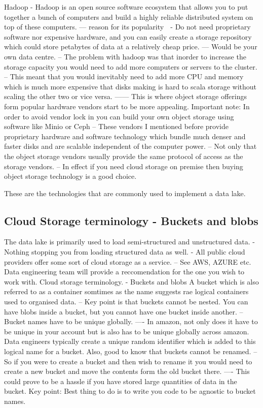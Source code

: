 \documentclass[a4paper, 11pt]{article}
\begin{document}
    Hadoop
    - Hadoop is an open source software ecosystem that allows you to put together a bunch of computers and build a highly reliable distributed system on top of these computers.
    --- reason for its popularity ^^^
    - Do not need proprietary software nor expensive hardware, and you can easily create a storage repository which could store petabytes of data at a relatively cheap price.
    --- Would be your own data centre.
    -- The problem with hadoop was that inorder to increase the storage capacity you would need to add more computers or servers to the cluster.
    -- This meant that you would inevitably need to add more CPU and memory which is much more expensive that disks making is hard to scala storage without scaling the other two or vice versa.
    ------ This is where object storage offerings form popular hardware vendors start to be more appealing.
    Important note: In order to avoid vendor lock in you can build your own object storage  using software like Minio or Ceph
    -- These vendors I mentioned before provide proprietary hardware and software technology which bundle much denser and faster disks and are scalable independent of the computer power.
    -- Not only that the object storage vendors usually provide the same protocol of access as the storage vendors.
    -- In effect if you need cloud storage on premise then buying object storage technology is a good choice.

    These are the technologies that are commonly used to implement a data lake.

    \subsection{Cloud Storage terminology - Buckets and blobs}

    The data lake is primarily used to load semi-structured and unstructured data.
    - Nothing stopping you from loading structured data as well.
    - All public cloud providers offer some sort of cloud storage as a service.
    -- See AWS, AZURE etc. Data engineering team will provide a reccomendation for the one you wish to work with.
    Cloud storage terminology.
    - Buckets and blobs
    A bucket which is also referred to as a container somtimes as the name suggests rae logical containers used to organised data.
    -- Key point is that buckets cannot be nested.
    You can have blobs inside a bucket, but you cannot have one bucket inside another.
    -- Bucket names have to be unique globally.
    ---- In amazon, not only does it have to be unique in your account but is also has to be unique globally across amazon.
    Data engineers typically create a unique random identifier which is added to this logical name for a bucket.
    Also, good to know that buckets cannot be renamed.
    -- So if you were to create a bucket and then wish to rename it you would need to create a new bucket and move the contents form the old bucket there.
    ---- This could prove to be a hassle if you have stored large quantities of data in the bucket.
    Key point: Best thing to do is to write you code to be agnostic to bucket names.
\end{document}
